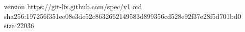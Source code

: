 version https://git-lfs.github.com/spec/v1
oid sha256:197256f351ee08e3dc52c8632662149583d899356cd528e92f37e28f5d701bd0
size 22036
